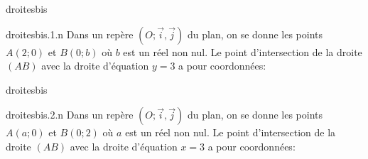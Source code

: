 \begin{qcm}{droitesbis}
    \begin{question}{droitesbis.1.n}
        Dans un repère $(O;\overrightarrow{i},\overrightarrow{j})$ du plan, on se donne
        les points $A(2;0)$ et $B(0;b)$ où $b$ est un réel non
        nul. Le point d'intersection de la droite $(AB)$ avec la droite
        d'équation $y=3$ a pour coordonnées:
        \vspace{-0.2cm}
        \begin{multicols}{2}
            \begin{reponses}       
                \alafin
            \end{reponses} 
        \end{multicols}
    \end{question}
\end{qcm}

\begin{qcm}{droitesbis}
    \begin{question}{droitesbis.2.n}
        Dans un repère $(O;\overrightarrow{i},\overrightarrow{j})$ du plan, on se donne
        les points $A(a;0)$ et $B(0;2)$ où $a$ est un réel non
        nul. Le point d'intersection de la droite $(AB)$ avec la droite
        d'équation $x=3$ a pour coordonnées:
        \vspace{-0.2cm}
        \begin{multicols}{2}
            \begin{reponses}       
                \alafin
            \end{reponses} 
        \end{multicols}
    \end{question}
\end{qcm}
